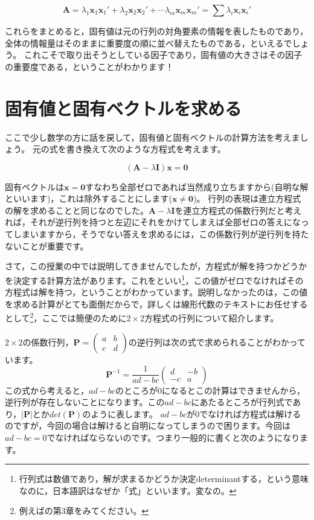 \documentclass{ltjsbook}
\begin{document}
\[
    \bm{A}= \lambda_1 \bm{x}_1 \bm{x}_1' + \lambda_2 \bm{x}_2 \bm{x}_2' + \cdots \lambda_m \bm{x}_m \bm{x}_m'= \sum \lambda_{i} \bm{x}_{i} \bm{x}_i'
\]

これらをまとめると，固有値は元の行列の対角要素の情報を表したものであり，全体の情報量はそのままに重要度の順に並べ替えたものである，といえるでしょう。
これこそで取り出そうとしている因子であり，固有値の大きさはその因子の重要度である，ということがわかります！

\section{固有値と固有ベクトルを求める}
ここで少し数学の方に話を戻して，固有値と固有ベクトルの計算方法を考えましょう。
元の式を書き換えて次のような方程式を考えます。

\[ (\bm{A} - \lambda\bm{I})\bm{x} = \bm{0} \]

固有ベクトルは$\bm{x}=\bm{0}$すなわち全部ゼロであれば当然成り立ちますから(自明な解といいます)，これは除外することにします($\bm{x}\neq \bm{0}$)。
行列の表現は連立方程式の解を求めることと同じなのでした。$\bm{A} - \lambda\bm{I}$を連立方程式の係数行列だと考えれば，それが逆行列を持つと左辺にそれをかけてしまえば全部ゼロの答えになってしまいますから，そうでない答えを求めるには，この係数行列が逆行列を持たないことが重要です。

さて，この授業の中では説明してきませんでしたが，方程式が解を持つかどうかを決定する計算方法があります。これをといい\footnote{行列式は数値であり，解が求まるかどうか決定determinantする，という意味なのに，日本語訳はなぜか「式」といいます。変なの。}，この値がゼロでなければその方程式は解を持つ，ということがわかっています。説明しなかったのは，この値を求める計算がとても面倒だからで，詳しくは線形代数のテキストにお任せするとして\footnote{例えば\citet{村上正康2016-03-01}の第3章をみてください。}，ここでは簡便のために$2\times2$方程式の行列について紹介します。

$2 \times 2$の係数行列，$\bm{P}=\begin{pmatrix} a&b\\c&d \end{pmatrix}$の逆行列は次の式で求められることがわかっています。
\[ \bm{P}^{-1}= \frac{1}{ad-bc}\begin{pmatrix}d & -b \\ -c &a \end{pmatrix} \]
この式から考えると，$ad - bc$のところが0になるとこの計算はできませんから，逆行列が存在しないことになります。この$ad-bc$にあたるところが行列式であり，$|\bm{P}|$とか$det(\bm{P})$のように表します。
$ad-bc$が0でなければ方程式は解けるのですが，今回の場合は解けると自明になってしまうので困ります。今回は$ad-bc=0$でなければならないのです。つまり一般的に書くと次のようになります。
\end{document}
